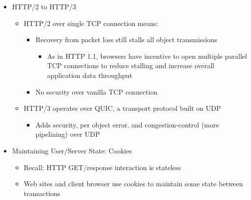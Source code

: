 \begin{itemize}
\begin{itemize}
    \end{itemize}

  \item HTTP/2 to HTTP/3

    \begin{itemize}

      \item HTTP/2 over single TCP connection means:

        \begin{itemize}

          \item Recovery from packet loss still stalls all object transmissions
            
            \begin{itemize}

              \item As in HTTP 1.1, browsers have incentive to open multiple parallel TCP connections to reduce stalling and increase overall application data throughput

            \end{itemize}

          \item No security over vanilla TCP connection

        \end{itemize}

      \item HTTP/3 operates over QUIC, a transport protocol built on UDP

        \begin{itemize}

          \item Adds security, per object error, and congestion-control (more pipelining) over UDP

        \end{itemize}

    \end{itemize}

  \item Maintaining User/Server State: Cookies

    \begin{itemize}

      \item Recall: HTTP GET/response interaction is stateless

      \item Web sites and client browser use cookies to maintain some state between transactions


\end{itemize}
\end{itemize}
